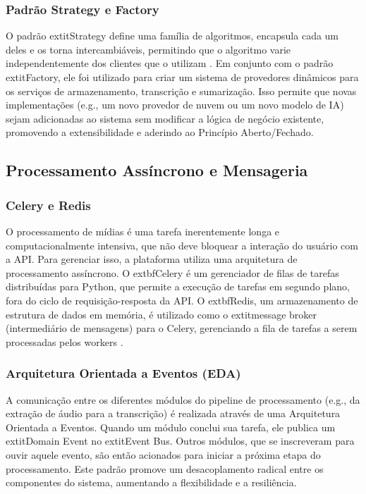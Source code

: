 \subsubsection{Padrão Strategy e Factory}
O padrão 	extit{Strategy} define uma família de algoritmos, encapsula cada um deles e os torna intercambiáveis, permitindo que o algoritmo varie independentemente dos clientes que o utilizam \cite{gamma1995design}. Em conjunto com o padrão 	extit{Factory}, ele foi utilizado para criar um sistema de provedores dinâmicos para os serviços de armazenamento, transcrição e sumarização. Isso permite que novas implementações (e.g., um novo provedor de nuvem ou um novo modelo de IA) sejam adicionadas ao sistema sem modificar a lógica de negócio existente, promovendo a extensibilidade e aderindo ao Princípio Aberto/Fechado.

\subsection{Processamento Assíncrono e Mensageria}

\subsubsection{Celery e Redis}
O processamento de mídias é uma tarefa inerentemente longa e computacionalmente intensiva, que não deve bloquear a interação do usuário com a API. Para gerenciar isso, a plataforma utiliza uma arquitetura de processamento assíncrono. O 	extbf{Celery} é um gerenciador de filas de tarefas distribuídas para Python, que permite a execução de tarefas em segundo plano, fora do ciclo de requisição-resposta da API. O 	extbf{Redis}, um armazenamento de estrutura de dados em memória, é utilizado como o 	extit{message broker} (intermediário de mensagens) para o Celery, gerenciando a fila de tarefas a serem processadas pelos workers \cite{celery_documentation}.

\subsubsection{Arquitetura Orientada a Eventos (EDA)}
A comunicação entre os diferentes módulos do pipeline de processamento (e.g., da extração de áudio para a transcrição) é realizada através de uma Arquitetura Orientada a Eventos. Quando um módulo conclui sua tarefa, ele publica um 	extit{Domain Event} no 	extit{Event Bus}. Outros módulos, que se inscreveram para ouvir aquele evento, são então acionados para iniciar a próxima etapa do processamento. Este padrão promove um desacoplamento radical entre os componentes do sistema, aumentando a flexibilidade e a resiliência.

